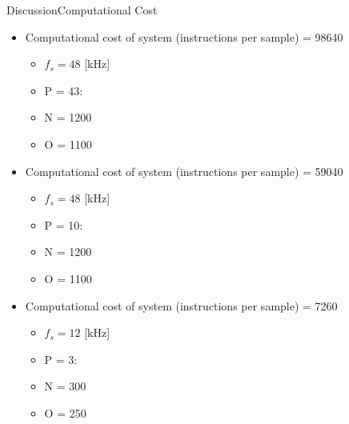 \begin{frame}{Discussion}{Computational Cost}		
\begin{itemize}
\item Computational cost of system (instructions per sample) = 98640
	\begin{itemize} 
		\item $f_s = 48$ [kHz]
		\item P = 43: 
		\item N = 1200
		\item O = 1100
	\end{itemize}
\item Computational cost of system (instructions per sample) = 59040
	\begin{itemize}
		\item $f_s = 48$ [kHz]
		\item P = 10: 
		\item N = 1200
		\item O = 1100
	\end{itemize}
\item Computational cost of system (instructions per sample) = 7260
	\begin{itemize}
		\item $f_s = 12$ [kHz]
		\item P = 3: 
		\item N = 300
		\item O = 250
	\end{itemize}
\end{itemize}
\end{frame}


